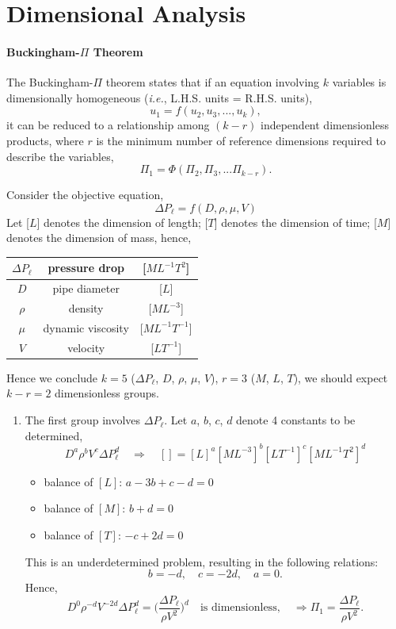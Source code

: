 \documentclass[a4paper]{article}
\begin{document}
\section{Dimensional Analysis}
\paragraph{Buckingham-$\Pi$ Theorem} The Buckingham-$\Pi$ theorem states that if an equation involving $k$ variables is dimensionally homogeneous (\textit{i.e.}, L.H.S. units = R.H.S. units), 
\[
    u_1 = f(u_2, u_3, ..., u_k),
\]
it can be reduced to a relationship among $(k-r)$ independent dimensionless products, where $r$ is the minimum number of reference dimensions required to describe the variables,
\[
    \Pi_1 = \Phi(\Pi_2, \Pi_3, ... \Pi_{k-r}).
\]

\begin{tcolorbox}[title = \textbf{Example}]
Consider the objective equation,
\[
    \Delta P_\ell = f (D, \rho, \mu, V)
\]
Let [$L$] denotes the dimension of length; [$T$] denotes the dimension of time; [$M$] denotes the dimension of mass, hence,
\begin{table}[H]
    \centering
    \begin{tabular}{ccc}
    \toprule
    $\Delta P_\ell$ &   pressure drop   &   [$ML^{-1}T^2$] \\
    \midrule
    $D$   &   pipe diameter  &   [$L$] \\
    $\rho$  &   density  & [$ML^{-3}$]\\
    $\mu$   &   dynamic viscosity   &   [$ML^{-1}T^{-1}$] \\
    $V$ &   velocity    &   [$LT^{-1}$] \\
    \bottomrule
    \end{tabular}
\end{table}
Hence we conclude $k = 5$ ($\Delta P_\ell$, $D$, $\rho$, $\mu$, $V$), $r = 3$ ($M$, $L$, $T$), we should expect $k-r = 2$ dimensionless groups.
\begin{enumerate}
    \item The first group involves $\Delta P_\ell$. Let $a$, $b$, $c$, $d$ denote 4 constants to be determined,
    \[
        D^a \rho^b V^c \Delta P_\ell^d \quad \Rightarrow \quad [] = [L]^a [ML^{-3}]^b [LT^{-1}]^c [ML^{-1}T^2]^d
    \]

    \begin{itemize}
        \item balance of $[L]$: $a - 3b + c - d = 0$
        \item balance of $[M]$: $b + d = 0$
        \item balance of $[T]$: $-c + 2d = 0$
    \end{itemize}
    This is an underdetermined problem, resulting in the following relations:
    \[
        b = -d, 
        \quad c = -2d,
        \quad a = 0.
    \]
    Hence, 
    \[
        D^0 \rho^{-d} V^{-2d} \Delta P_\ell^d = \bigg(\frac{\Delta P_\ell}{\rho V^2} \bigg)^d \quad \text{is dimensionless}, \quad \Rightarrow \boxed{\Pi_1 = \frac{\Delta P_\ell}{\rho V^2}}.   
    \]


\end{enumerate}
\end{tcolorbox}
\end{document}

